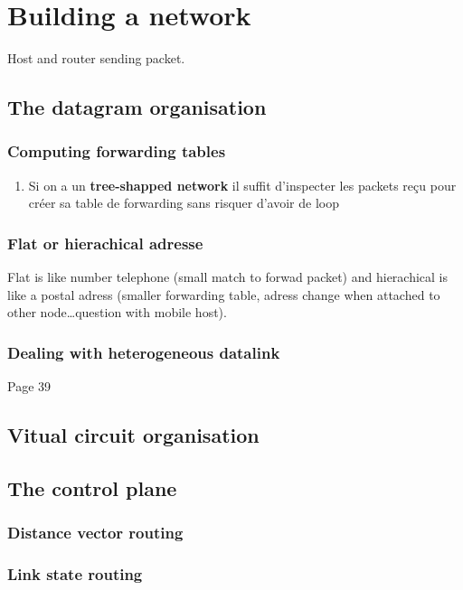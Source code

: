 \documentclass{report}
\begin{document}
\section{Building a network}
Host and router sending packet.

\subsection{The datagram organisation}

\subsubsection{Computing forwarding tables}
\begin{enumerate}
    \item Si on a un \textbf{tree-shapped network} il suffit d'inspecter les packets
        reçu pour créer sa table de forwarding sans risquer d'avoir de loop
\end{enumerate}

\subsubsection{Flat or hierachical adresse}
Flat is like number telephone (small match to forwad packet) and hierachical is like a postal adress (smaller forwarding table, adress change when attached to other node\ldots question with mobile host).

\subsubsection{Dealing with heterogeneous datalink}
Page 39

\subsection{Vitual circuit organisation}

\subsection{The control plane}

\subsubsection{Distance vector routing}

\subsubsection{Link state routing}
\end{document}
